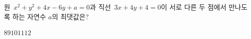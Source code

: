 원~$x^2+y^2+4x-6y+a=0$과 직선~$3x+4y+4=0$이 서로 다른 두 점에서 만나도록 하는 자연수 $a$의 최댓값은?
\begin{choices32}{$8$}{$9$}{$10$}{$11$}{$12$}\end{choices32}
